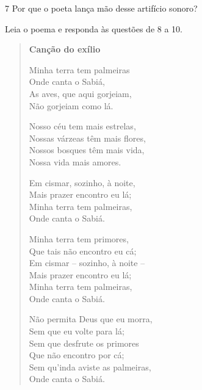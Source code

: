 

\num{7} Por que o poeta lança mão desse artifício sonoro?


\pagebreak
Leia o poema e responda às questões de 8 a 10.

\begin{minipage}{.5\textwidth}
\begin{verse}
\textbf{Canção do exílio}

Minha terra tem palmeiras\\
Onde canta o Sabiá,\\
As aves, que aqui gorjeiam,\\
Não gorjeiam como lá.

Nosso céu tem mais estrelas,\\
Nossas várzeas têm mais flores,\\
Nossos bosques têm mais vida,\\
Nossa vida mais amores.

Em cismar, sozinho, à noite,\\
Mais prazer encontro eu lá;\\
Minha terra tem palmeiras,\\
Onde canta o Sabiá.

Minha terra tem primores,\\
Que tais não encontro eu cá;\\
Em cismar – sozinho, à noite –\\
Mais prazer encontro eu lá;\\
Minha terra tem palmeiras,\\
Onde canta o Sabiá.

Não permita Deus que eu morra,\\
Sem que eu volte para lá;\\
Sem que desfrute os primores\\
Que não encontro por cá;\\
Sem qu'inda aviste as palmeiras,\\
Onde canta o Sabiá.

\end{verse}
\end{minipage}\hspace{1cm}
